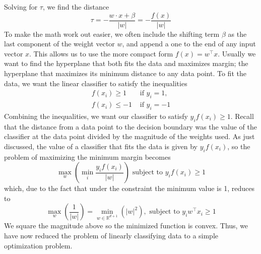 \documentclass{article}
\begin{document}
Solving for $ \tau $, we find the distance
$$ \tau = - \frac{w \cdot x + \beta}{|w|} = - \frac{f(x)}{|w|} $$
\newline \newline
To make the math work out easier, we often include the shifting term $ \beta $ as the last component of the weight vector $ w $, and append a one to the end of any input vector $ x $. This allows us to use the more compact form $ f(x) = w^\intercal x $. Usually we want to find the hyperplane that both fits the data and maximizes margin; the hyperplane that maximizes its minimum distance to any data point. To fit the data, we want the linear classifier to satisfy the inequalities
$$ \begin{aligned}
	f(x_i) \geq 1 &\text{ if } y_i = 1,  \\
	f(x_i) \leq -1 &\text{ if } y_i = -1 
\end{aligned} $$
Combining the inequalities, we want our classifier to satisfy $ y_i f(x_i) \geq 1 $. Recall that the distance from a data point to the decision boundary was the value of the classifier at the data point divided by the magnitude of the weights used. As just discussed, the value of a classifier that fits the data is given by $ y_i f(x_i) $, so the problem of maximizing the minimum margin becomes
$$ \max_w \left( \min_{i} \frac{y_i f(x_i)}{|w|} \right) \text{ subject to } y_i f(x_i) \geq 1 $$
which, due to the fact that under the constraint the minimum value is 1, reduces to
$$ \max_w \left( \frac{1}{|w|} \right) = \min_{w \in \mathbb{R}^{d + 1}} (|w|^2), \text{ subject to } y_i w^\intercal x_i \geq 1 $$
We square the magnitude above so the minimized function is convex. Thus, we have now reduced the problem of linearly classifying data to a simple optimization problem.
\end{document}
